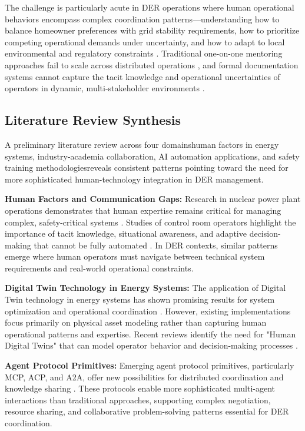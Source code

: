 \documentclass[12pt,a4paper]{article}
\newcommand{\emdash}{\textemdash}
\begin{document}
The challenge is particularly acute in DER operations where human operational behaviors encompass complex coordination patterns—understanding how to balance homeowner preferences with grid stability requirements, how to prioritize competing operational demands under uncertainty, and how to adapt to local environmental and regulatory constraints \cite{10.1109/ACCESS.2024.3387400}. Traditional one-on-one mentoring approaches fail to scale across distributed operations \cite{10.1007/s44163-022-00020-w}, and formal documentation systems cannot capture the tacit knowledge and operational uncertainties of operators in dynamic, multi-stakeholder environments \cite{10.1016/j.apergo.2018.07.016}.

\subsection{Literature Review Synthesis}

A preliminary literature review across four domains\emdash{}human factors in energy systems, industry-academia collaboration, AI automation applications, and safety training methodologies\emdash{}reveals consistent patterns pointing toward the need for more sophisticated human-technology integration in DER management.

\textbf{Human Factors and Communication Gaps:} Research in nuclear power plant operations demonstrates that human expertise remains critical for managing complex, safety-critical systems \cite{10.1108/13552510610654510}. Studies of control room operators highlight the importance of tacit knowledge, situational awareness, and adaptive decision-making that cannot be fully automated \cite{10.1049/OAP-CIRED.2017.1107}. In DER contexts, similar patterns emerge where human operators must navigate between technical system requirements and real-world operational constraints.

\textbf{Digital Twin Technology in Energy Systems:} The application of Digital Twin technology in energy systems has shown promising results for system optimization and operational coordination \cite{10.1016/j.esr.2024.101334}. However, existing implementations focus primarily on physical asset modeling rather than capturing human operational patterns and expertise. Recent reviews identify the need for "Human Digital Twins" that can model operator behavior and decision-making processes \cite{10.1109/ETFA61755.2024.10711109}.

\textbf{Agent Protocol Primitives:} Emerging agent protocol primitives, particularly MCP, ACP, and A2A, offer new possibilities for distributed coordination and knowledge sharing \cite{10.5220/0001894702000205}. These protocols enable more sophisticated multi-agent interactions than traditional approaches, supporting complex negotiation, resource sharing, and collaborative problem-solving patterns essential for DER coordination.
\end{document}
